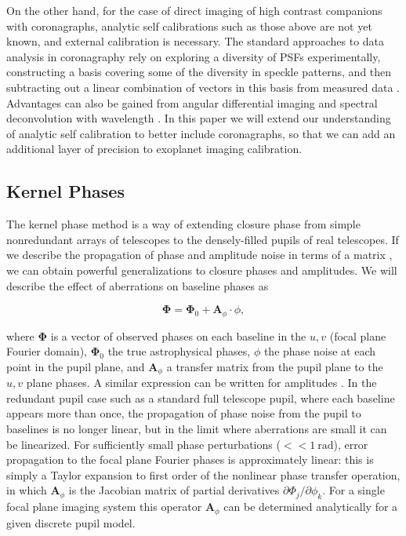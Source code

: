 \documentclass[modern]{aastex63}
\begin{document}
On the other hand, for the case of direct imaging of high contrast companions with coronagraphs, analytic self calibrations such as those above are not yet known, and external calibration is necessary. The standard approaches to data analysis in coronagraphy rely on exploring a diversity of PSFs experimentally, constructing a basis covering some of the diversity in speckle patterns, and then subtracting out a linear combination of vectors in this basis from measured data \citep[e.g. KLIP;][]{lafreniere07,soummer12,pueyo16}. Advantages can also be gained from angular differential imaging \citep[ADI;][]{marois06} and spectral deconvolution with wavelength \citep{sparks02}. In this paper we will extend our understanding of analytic self calibration to better include coronagraphs, so that we can add an additional layer of precision to exoplanet imaging calibration.

\subsection{Kernel Phases}

The kernel phase method is a way of extending closure phase from simple nonredundant arrays of telescopes to the densely-filled pupils of real telescopes. If we describe the propagation of phase and amplitude noise in terms of a matrix \citep{lannes1991}, we can obtain powerful generalizations to closure phases and amplitudes. We will describe the effect of aberrations on baseline phases as

\begin{equation}
    \mathbf{\Phi} = \mathbf{\Phi}_0 + \mathbf{A}_\phi \cdot \phi,
\end{equation}

\noindent where $\mathbf{\Phi}$ is a vector of observed phases on each baseline in the $u,v$ (focal plane Fourier domain), $\mathbf{\Phi}_0$ the true astrophysical phases, $\phi$ the phase noise at each point in the pupil plane, and $\mathbf{A}_\phi$ a transfer matrix from the pupil plane to the $u,v$ plane phases. A similar expression can be written for amplitudes \citep{pope16}. In the redundant pupil case such as a standard full telescope pupil, where each baseline appears more than once, the propagation of phase noise from the pupil to baselines is no longer linear, but in the limit where aberrations are small it can be linearized. For sufficiently small phase perturbations ($<< 1~\text{rad}$), error propagation to the focal plane Fourier phases is approximately linear: this is simply a Taylor expansion to first order of the nonlinear phase transfer operation, in which $\mathbf{A}_\phi$ is the Jacobian matrix of partial derivatives $\partial\Phi_j/\partial\phi_k$. For a single focal plane imaging system this operator $\mathbf{A}_\phi$ can be determined analytically for a given discrete pupil model. 
\end{document}
